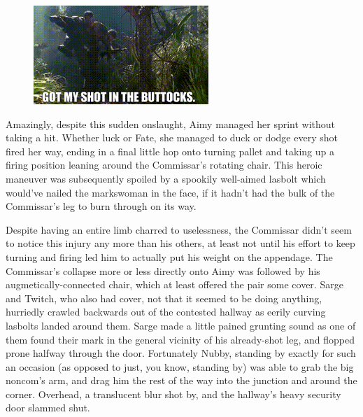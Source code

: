 \begin{figure}
	\begin{center}
		\includegraphics[width=\figwidth]{pics/21/109.png}
	\end{center}
\end{figure}
Amazingly, despite this sudden onslaught, Aimy managed her sprint without taking a hit. 
Whether luck or Fate, she managed to duck or dodge every shot fired her way, ending in a final little hop onto turning pallet and taking up a firing position leaning around the Commissar's rotating chair. 
This heroic maneuver was subsequently spoiled by a spookily well-aimed lasbolt which would've nailed the markswoman in the face, if it hadn't had the bulk of the Commissar's leg to burn through on its way. 


Despite having an entire limb charred to uselessness, the Commissar didn't seem to notice this injury any more than his others, at least not until his effort to keep turning and firing led him to actually put his weight on the appendage. 
The Commissar's collapse more or less directly onto Aimy was followed by his augmetically-connected chair, which at least offered the pair some cover. 
Sarge and Twitch, who also had cover, not that it seemed to be doing anything, hurriedly crawled backwards out of the contested hallway as eerily curving lasbolts landed around them. 
Sarge made a little pained grunting sound as one of them found their mark in the general vicinity of his already-shot leg, and flopped prone halfway through the door. 
Fortunately Nubby, standing by exactly for such an occasion (as opposed to just, you know, standing by) was able to grab the big noncom's arm, and drag him the rest of the way into the junction and around the corner. 
Overhead, a translucent blur shot by, and the hallway's heavy security door slammed shut.

